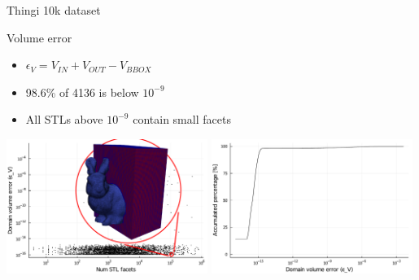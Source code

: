 \documentclass{beamer}
\begin{document}
\begin{frame}{Thingi 10k dataset}

  \begin{block}{Volume error}
  \begin{itemize}
    \item
      $\epsilon_V = V_{IN} + V_{OUT} - V_{BBOX}$
    \item
      98.6\% of 4136 is below $10^{-9}$
    \item
      All STLs above $10^{-9}$ contain small facets
  \end{itemize}
  \end{block}

  \includegraphics[width=0.49\textwidth]{num_stl_facets_volume_error_bunny}
  \includegraphics[width=0.49\textwidth]{../analysis/plots/histogram_volume_error}
\end{frame}
\end{document}
